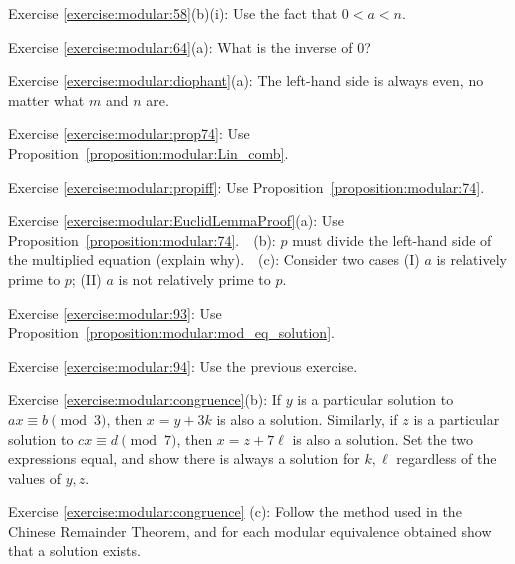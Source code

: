 \noindent Exercise \ref{exercise:modular:58}(b)(i): Use the fact that $0 < a < n$.

\noindent Exercise \ref{exercise:modular:64}(a): What is the inverse of $0$?

\noindent Exercise \ref{exercise:modular:diophant}(a): The left-hand side is always even, no matter what $m$ and $n$ are.

\noindent Exercise \ref{exercise:modular:prop74}: Use Proposition~\ref{proposition:modular:Lin_comb}.

\noindent Exercise \ref{exercise:modular:propiff}: Use Proposition~\ref{proposition:modular:74}.

\noindent Exercise \ref{exercise:modular:EuclidLemmaProof}(a): Use  Proposition~\ref{proposition:modular:74}.~~(b): $p$ must divide the left-hand side of the multiplied equation (explain why).~~(c): Consider two cases (I) $a$ is relatively prime to $p$; (II) $a$ is not relatively prime to $p$.

\noindent Exercise \ref{exercise:modular:93}: Use Proposition~\ref{proposition:modular:mod_eq_solution}. 

\noindent Exercise \ref{exercise:modular:94}: Use the previous exercise.

\noindent Exercise \ref{exercise:modular:congruence}(b):  If  $y$ is a particular solution to $ax \equiv b \pmod 3$, then $x=y+3k$ is also a solution. Similarly, if $z$ is 
 a particular solution to $cx \equiv d \pmod 7$, then $x=z+7\ell$ is also a solution. Set the two expressions equal, and show there is always a solution for $k, \ell$ regardless of the values of $y,z$.

\noindent Exercise \ref{exercise:modular:congruence}  (c): Follow the method used in the Chinese Remainder Theorem, and for each modular equivalence obtained show that a solution exists.